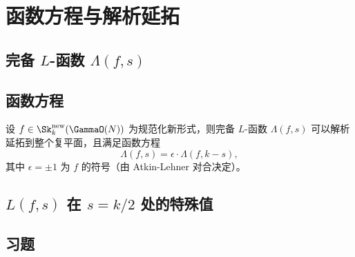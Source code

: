 \chapter{函数方程与解析延拓}
\label{ch:functional-equation}

\section{完备 $L$-函数 $\Lambda(f, s)$}


\section{函数方程}

\begin{theorem}[函数方程]
设 $f \in \Sk_k^{\mathrm{new}}(\GammaO(N))$ 为规范化新形式，则完备
$L$-函数 $\Lambda(f, s)$ 可以解析延拓到整个复平面，且满足函数方程
\[
  \Lambda(f, s) = \epsilon \cdot \Lambda(f, k - s),
\]
其中 $\epsilon = \pm 1$ 为 $f$ 的符号（由 Atkin-Lehner 对合决定）。
\end{theorem}


\section{$L(f, s)$ 在 $s = k/2$ 处的特殊值}


\section{习题}
